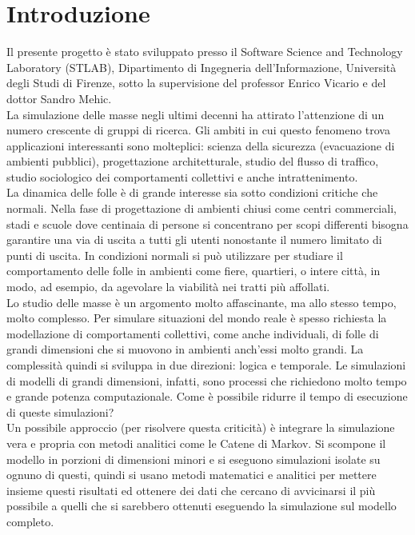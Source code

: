 \chapter{Introduzione}
Il presente progetto è stato sviluppato presso il Software Science and Technology Laboratory (STLAB), Dipartimento di Ingegneria dell'Informazione, Università degli Studi di Firenze, sotto la supervisione del professor Enrico Vicario e del dottor Sandro Mehic.\\
La simulazione delle masse negli ultimi decenni ha attirato l'attenzione di un numero crescente di gruppi di ricerca. Gli ambiti in cui questo fenomeno trova applicazioni interessanti sono molteplici: scienza della sicurezza (evacuazione di ambienti pubblici), progettazione architetturale, studio del flusso di traffico, studio sociologico dei comportamenti collettivi e anche intrattenimento.\\
La dinamica delle folle è di grande interesse sia sotto condizioni critiche che normali. Nella fase di progettazione di ambienti chiusi come centri commerciali, stadi e scuole dove centinaia di persone si concentrano per scopi differenti bisogna garantire una via di uscita a tutti gli utenti nonostante il numero limitato di punti di uscita. In condizioni normali si può utilizzare per studiare il comportamento delle folle in ambienti come fiere, quartieri, o intere città, in modo, ad esempio, da agevolare la viabilità nei tratti più affollati.\\
Lo studio delle masse è un argomento molto affascinante, ma allo stesso tempo, molto complesso. Per simulare situazioni del mondo reale è spesso richiesta la modellazione di comportamenti collettivi, come anche individuali, di folle di grandi dimensioni che si muovono in ambienti anch'essi molto grandi. La complessità quindi si sviluppa in due direzioni: logica e temporale. Le simulazioni di modelli di grandi dimensioni, infatti, sono processi che richiedono molto tempo e grande potenza computazionale. Come è possibile ridurre il tempo di esecuzione di queste simulazioni? \\
Un possibile approccio (per risolvere questa criticità) è integrare la simulazione vera e propria con metodi analitici come le Catene di Markov. Si scompone il modello in porzioni di dimensioni minori e si eseguono simulazioni isolate su ognuno di questi, quindi si usano metodi matematici e analitici per mettere insieme questi risultati ed ottenere dei dati che cercano di avvicinarsi il più possibile a quelli che si sarebbero ottenuti eseguendo la simulazione sul modello completo.\\
